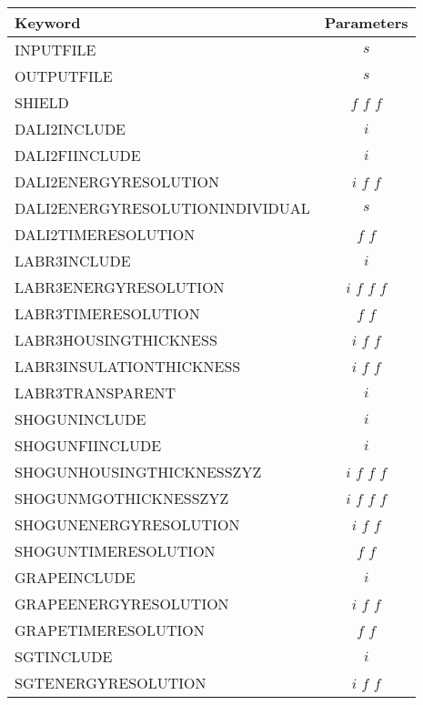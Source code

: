 \documentclass[12pt]{book}
\begin{document}
\begin{table}[ht]
  \centering
  \label{tab:EVENTBUILDERKEY}
  \begin{tabular}{|l||c|}
    \hline
    Keyword & Parameters \\
    \hline
    \hline
    INPUTFILE                        & $s$             \\
    OUTPUTFILE                       & $s$             \\
    SHIELD                           & $f$ $f$ $f$     \\
    DALI2INCLUDE                     & $i$             \\
    DALI2FIINCLUDE                   & $i$             \\
    DALI2ENERGYRESOLUTION            & $i$ $f$ $f$     \\
    DALI2ENERGYRESOLUTIONINDIVIDUAL  & $s$             \\
    DALI2TIMERESOLUTION              & $f$ $f$         \\
    LABR3INCLUDE			& $i$ 		\\
    LABR3ENERGYRESOLUTION		& $i$ $f$ $f$ $f$	\\
    LABR3TIMERESOLUTION              & $f$ $f$         \\
    LABR3HOUSINGTHICKNESS		& $i$ $f$ $f$	\\
    LABR3INSULATIONTHICKNESS		& $i$ $f$ $f$	\\
    LABR3TRANSPARENT			& $i$		\\
    SHOGUNINCLUDE                    & $i$             \\
    SHOGUNFIINCLUDE                  & $i$             \\
    SHOGUNHOUSINGTHICKNESSZYZ        & $i$ $f$ $f$ $f$ \\
    SHOGUNMGOTHICKNESSZYZ            & $i$ $f$ $f$ $f$ \\
    SHOGUNENERGYRESOLUTION           & $i$ $f$ $f$     \\
    SHOGUNTIMERESOLUTION             & $f$ $f$         \\
    GRAPEINCLUDE                     & $i$             \\
    GRAPEENERGYRESOLUTION            & $i$ $f$ $f$     \\
    GRAPETIMERESOLUTION              & $f$ $f$         \\
    SGTINCLUDE                       & $i$             \\
    SGTENERGYRESOLUTION              & $i$ $f$ $f$     \\

\end{tabular}
\end{table}
\end{document}
